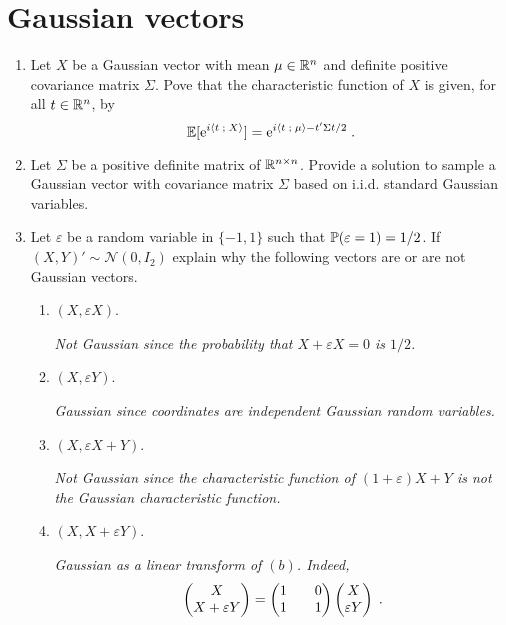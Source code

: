 \section{Gaussian vectors}
\begin{enumerate}
\item Let $X$ be a Gaussian vector with mean $\mu\in\mathbb{R}^n$ and definite positive covariance matrix $\Sigma$. Pove that the characteristic function of $X$ is given, for all $t\in\mathbb{R}^n$, by
\[
\mathbb{E}[\mathrm{e}^{i\langle t\;;\; X\rangle}] = \mathrm{e}^{i\langle t\;;\; \mu\rangle - t'\Sigma t /2}\;.
\]

\vspace{.2cm}

{\em

}

\item Let $\Sigma$ be a positive definite matrix of $\mathbb{R}^{n\times n}$. Provide a solution to sample a Gaussian vector with covariance matrix $\Sigma$ based on i.i.d. standard Gaussian variables.

\vspace{.2cm}

{\em

}

\item Let $\varepsilon$ be a random variable in $\{-1,1\}$ such that $\mathbb{P}(\varepsilon = 1) = 1/2$. If $(X,Y)'\sim \mathcal{N}(0,I_2)$ explain why the following vectors are or are not Gaussian vectors.
\begin{enumerate}[-]
\item $(X,\varepsilon X)$\eqsp.

{\em
Not Gaussian since the probability that  $X +\varepsilon X = 0$ is $1/2$.
}
\item $(X,\varepsilon Y)$\eqsp.

{\em
Gaussian since coordinates are independent Gaussian random variables.
}
\item $(X,\varepsilon X + Y)$\eqsp.

{\em
Not Gaussian since the characteristic function of $(1+\varepsilon) X + Y$ is not the Gaussian characteristic function.
}
\item $(X,X + \varepsilon Y)$\eqsp.

{\em
Gaussian as a linear transform of $(b)$. Indeed,
$$
\begin{pmatrix} X \\X + \varepsilon Y\end{pmatrix} = \begin{pmatrix} 1 && 0 \\1 && 1\end{pmatrix}\begin{pmatrix} X \\ \varepsilon Y\end{pmatrix}\;.
$$
}
\end{enumerate}


\end{enumerate}
